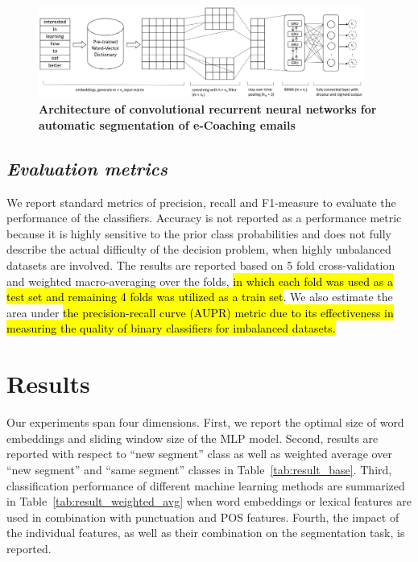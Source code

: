 \documentclass{amia}
\begin{document}
\begin{figure}[!htb]
    \centering
    \includegraphics[width=0.95\textwidth]{figures/CRNN.eps}
    \caption{\textbf{Architecture of convolutional recurrent neural networks for automatic segmentation of e-Coaching emails}}
    \label{fig:crnn}
\end{figure}
  
\subsection*{\textit{Evaluation metrics}}
We report standard metrics of precision, recall and F1-measure to evaluate the performance of the classifiers.\cite{aas1999text} Accuracy is not reported as a performance metric because it is highly sensitive to the prior class probabilities and does not fully describe the actual difficulty of the decision problem, when highly unbalanced datasets are involved. The results are reported based on 5 fold cross-validation and weighted macro-averaging over the folds, \hl{in which each fold was used as a test set and remaining 4 folds was utilized as a train set}. We also estimate the area under \hl{the precision-recall curve (AUPR) metric due to its effectiveness in measuring the quality of binary classifiers for imbalanced datasets.} \cite{davis2006relationship}

\section*{Results}
Our experiments span four dimensions. First, we report the optimal size of word embeddings and sliding window size of the MLP model. Second, results are reported with respect to ``new segment'' class as well as weighted average over ``new segment'' and ``same segment'' classes in Table~\ref{tab:result_base}. Third, classification performance of different machine learning methods are summarized in Table~\ref{tab:result_weighted_avg} when word embeddings or lexical features are used in combination with punctuation and POS features. Fourth, the impact of the individual features, as well as their combination on the segmentation task, is reported.
\end{document}
